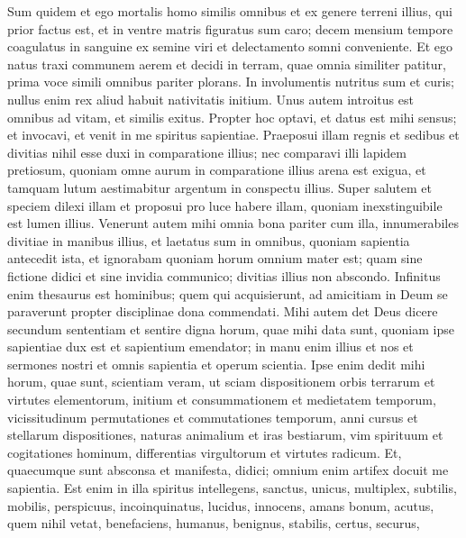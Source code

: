 \begin{biblechapter}
\begin{biblechapter}
\begin{biblechapter}
\begin{biblechapter}
\begin{biblechapter}
\begin{biblechapter}
\begin{biblechapter}
\verse Sum quidem et ego mortalis homo similis omnibus
 et ex genere terreni illius, qui prior factus est,
 et in ventre matris figuratus sum caro;
 \verse decem mensium tempore coagulatus in sanguine
 ex semine viri et delectamento somni conveniente.
 \verse Et ego natus traxi communem aerem
 et decidi in terram, quae omnia similiter patitur,
 prima voce simili omnibus pariter plorans.
 \verse In involumentis nutritus sum et curis;
 \verse nullus enim rex aliud habuit nativitatis initium.
 \verse Unus autem introitus est omnibus ad vitam,
 et similis exitus.
 \verse Propter hoc optavi, et datus est mihi sensus;
 et invocavi, et venit in me spiritus sapientiae.
 \verse Praeposui illam regnis et sedibus
 et divitias nihil esse duxi in comparatione illius;
 \verse nec comparavi illi lapidem pretiosum,
 quoniam omne aurum in comparatione illius arena est exigua,
 et tamquam lutum aestimabitur argentum in conspectu illius.
 \verse Super salutem et speciem dilexi illam
 et proposui pro luce habere illam,
 quoniam inexstinguibile est lumen illius.
 \verse Venerunt autem mihi omnia bona pariter cum illa,
 innumerabiles divitiae in manibus illius,
 \verse et laetatus sum in omnibus, quoniam sapientia antecedit ista,
 et ignorabam quoniam horum omnium mater est;
 \verse quam sine fictione didici et sine invidia communico;
 divitias illius non abscondo.
 \verse Infinitus enim thesaurus est hominibus;
 quem qui acquisierunt, ad amicitiam in Deum se paraverunt
 propter disciplinae dona commendati.
 \verse Mihi autem det Deus dicere secundum sententiam
 et sentire digna horum, quae mihi data sunt,
 quoniam ipse sapientiae dux est
 et sapientium emendator;
 \verse in manu enim illius et nos et sermones nostri
 et omnis sapientia et operum scientia.
 \verse Ipse enim dedit mihi horum, quae sunt, scientiam veram,
 ut sciam dispositionem orbis terrarum et virtutes elementorum,
 \verse initium et consummationem et medietatem temporum,
 vicissitudinum permutationes et commutationes temporum,
 \verse anni cursus et stellarum dispositiones,
 \verse naturas animalium et iras bestiarum,
 vim spirituum et cogitationes hominum,
 differentias virgultorum et virtutes radicum.
 \verse Et, quaecumque sunt absconsa et manifesta, didici;
 omnium enim artifex docuit me sapientia.
 \verse Est enim in illa spiritus intellegens, sanctus,
 unicus, multiplex, subtilis,
 mobilis, perspicuus, incoinquinatus,
 lucidus, innocens, amans bonum, acutus,
 \verse quem nihil vetat, benefaciens, humanus, benignus,
 stabilis, certus, securus,

\end{biblechapter}
\end{biblechapter}
\end{biblechapter}
\end{biblechapter}
\end{biblechapter}
\end{biblechapter}
\end{biblechapter}
